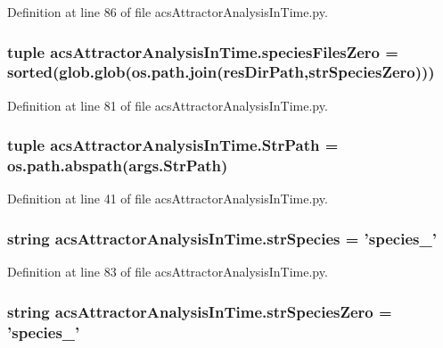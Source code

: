 Definition at line 86 of file acs\-Attractor\-Analysis\-In\-Time.\-py.

\hypertarget{a00123_a4657fd3a80cf1c76ab075d62d8de3bf3}{
\subsubsection[{species\-Files\-Zero}]{\setlength{\rightskip}{0pt plus 5cm}tuple acs\-Attractor\-Analysis\-In\-Time.\-species\-Files\-Zero = sorted(glob.\-glob(os.\-path.\-join({\bf res\-Dir\-Path},{\bf str\-Species\-Zero})))}}\label{a00123_a4657fd3a80cf1c76ab075d62d8de3bf3}


Definition at line 81 of file acs\-Attractor\-Analysis\-In\-Time.\-py.

\hypertarget{a00123_a1d168f4d444ea1d02f186a7568344fba}{
\subsubsection[{Str\-Path}]{\setlength{\rightskip}{0pt plus 5cm}tuple acs\-Attractor\-Analysis\-In\-Time.\-Str\-Path = os.\-path.\-abspath(args.\-Str\-Path)}}\label{a00123_a1d168f4d444ea1d02f186a7568344fba}


Definition at line 41 of file acs\-Attractor\-Analysis\-In\-Time.\-py.

\hypertarget{a00123_ac1f05e7db61bcc83ea1ed27460462202}{
\subsubsection[{str\-Species}]{\setlength{\rightskip}{0pt plus 5cm}string acs\-Attractor\-Analysis\-In\-Time.\-str\-Species = 'species\-\_\-'}}\label{a00123_ac1f05e7db61bcc83ea1ed27460462202}


Definition at line 83 of file acs\-Attractor\-Analysis\-In\-Time.\-py.

\hypertarget{a00123_aea2d717887265b294c623099d2495d4f}{
\subsubsection[{str\-Species\-Zero}]{\setlength{\rightskip}{0pt plus 5cm}string acs\-Attractor\-Analysis\-In\-Time.\-str\-Species\-Zero = 'species\-\_\-'}}\label{a00123_aea2d717887265b294c623099d2495d4f}


